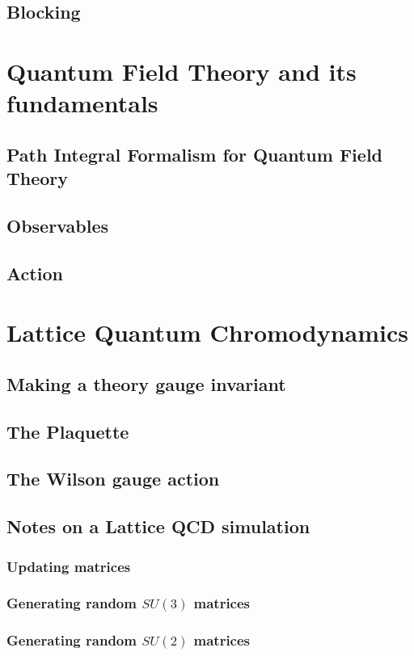 \documentclass[11pt]{article}
\begin{document}
\subsection{Blocking}
\section{Quantum Field Theory and its fundamentals}
\subsection{Path Integral Formalism for Quantum Field Theory}
\subsection{Observables}
\subsection{Action}
\section{Lattice Quantum Chromodynamics}
\subsection{Making a theory gauge invariant}
\subsection{The Plaquette}
\subsection{The Wilson gauge action}
\subsection{Notes on a Lattice QCD simulation}
\subsubsection{Updating matrices}
\subsubsection{Generating random \texorpdfstring{$SU(3)$}{SU3} matrices}
\subsubsection{Generating random \texorpdfstring{$SU(2)$}{SU2} matrices}


% 
\end{document}
